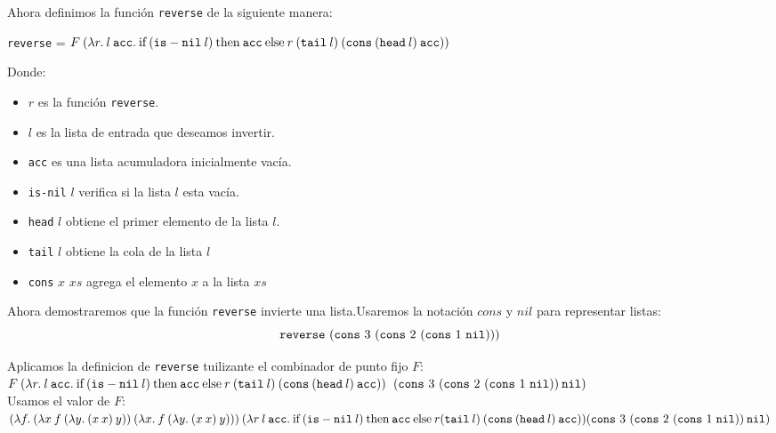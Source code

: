 \documentclass{article}
\begin{document}
\begin{enumerate}
        Ahora definimos la función {\tt reverse} de la siguiente manera:

        {\tt reverse} = $F\:(\lambda r.\:l\:{\tt acc}.\:\text{if}\:({\tt is-nil}\:l)\:\text{then}\:{\tt acc}\:\text{else}\:r\:({\tt tail}\:l)\:({\tt cons}\:({\tt head}\:l)\:{\tt acc}))$

         Donde:\\
        \begin{itemize}
            \item $r$ es la función {\tt reverse}.

            \item $l$ es la lista de entrada que deseamos invertir.

            \item {\tt acc} es una lista acumuladora inicialmente vacía.

            \item {\tt is-nil} $l$ verifica si la lista $l$ esta vacía.

            \item {\tt head} $l$ obtiene el primer elemento de la lista $l$.

            \item {\tt tail} $l$ obtiene la cola de la lista $l$

            \item {\tt cons} $x$ $xs$ agrega el elemento $x$ a la lista $xs$
        \end{itemize}

        Ahora demostraremos que la función {\tt reverse} invierte una lista.Usaremos la notación $cons$ y $nil$ para representar listas:\\
        $${\tt reverse}\,\, ({\tt cons}\,\, 3\,\, ({\tt cons}\,\, 2\,\, ({\tt cons}\,\, 1\,\, {\tt nil})))$$
        
        Aplicamos la definicion de {\tt reverse} tuilizante el combinador de punto fijo $F$:\\

        $F\:(\lambda r.\:l\:{\tt acc}.\:\text{if}\:({\tt is-nil}\:l)\:\text{then}\:{\tt acc}\:\text{else}\:r\:({\tt tail}\:l)\:({\tt cons}\:({\tt head}\:l)\:{\tt acc}))$ $({\tt cons}\,\, 3\,\, ({\tt cons}\,\, 2\,\, ({\tt cons}\,\, 1\,\, {\tt nil}))\:{\tt nil})$\\

        Usamos el valor de $F$:\\

        $(\lambda f.\:(\lambda x\:f\:(\lambda y.\:(x\:x)\:y))\:(\lambda x.\:f\:(\lambda y.\:(x\:x)\:y)))\:(\lambda r\:l\:{\tt acc}.\:\text{if}\:({\tt is-nil}\:l)\:\text{then}\:{\tt acc}\:\text{else}\:r({\tt tail}\:l)\:({\tt cons}\:({\tt head}\:l)\:{\tt acc}))\\
        ({\tt cons}\,\, 3\,\, ({\tt cons}\,\, 2\,\, ({\tt cons}\,\, 1\,\, {\tt nil}))\:{\tt nil})$\\


\end{enumerate}
\end{document}
